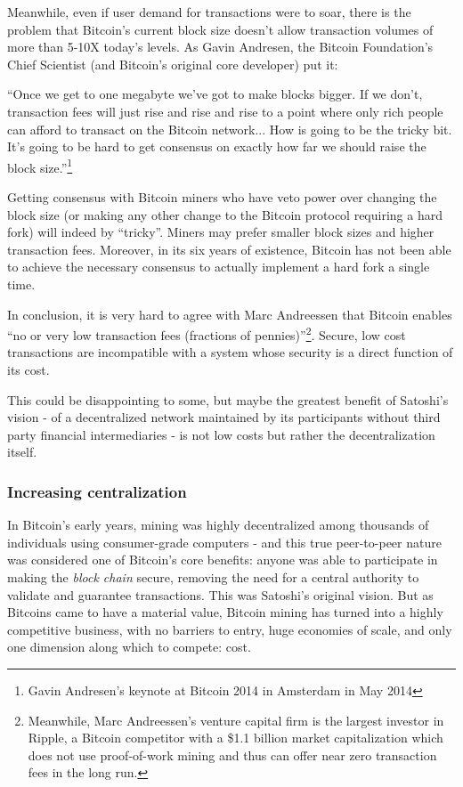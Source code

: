 \documentclass[a4paper,11pt]{article}
\begin{document}
Meanwhile, even if user demand for transactions were to soar, there is the problem that Bitcoin's current block size doesn't allow transaction volumes of more than 5-10X today's levels. As Gavin Andresen, the Bitcoin Foundation's Chief Scientist (and Bitcoin's original core developer) put it:

``Once we get to one megabyte we've got to make blocks bigger. If we don't, transaction fees will just rise and rise and rise to a point where only rich people can afford to transact on the Bitcoin network... How is going to be the tricky bit. It's going to be hard to get consensus on exactly how far we should raise the block size.''\footnote{Gavin Andresen's keynote at Bitcoin 2014 in Amsterdam in May 2014}

Getting consensus with Bitcoin miners who have veto power over changing the block size (or making any other change to the Bitcoin protocol requiring a hard fork)  will indeed by ``tricky''. Miners may prefer smaller block sizes and higher transaction fees. Moreover, in its six years of existence, Bitcoin has not been able to achieve the necessary consensus to actually implement a hard fork a single time. 

In conclusion, it is very hard to agree with Marc Andreessen that Bitcoin enables ``no or very low transaction fees (fractions of pennies)''\footnote{Meanwhile, Marc Andreessen's venture capital firm is the largest investor in Ripple, a Bitcoin competitor with a \$1.1 billion market capitalization which does not use proof-of-work mining and thus can offer near zero transaction fees in the long run.}. Secure, low cost transactions are incompatible with a system whose security is a direct function of its cost.

This could be disappointing to some, but maybe the greatest benefit of Satoshi's vision - of a decentralized network maintained by its participants without third party financial intermediaries - is not low costs but rather the decentralization itself.

\subsubsection{Increasing centralization}

In Bitcoin's early years, mining was highly decentralized among thousands of individuals using consumer-grade computers - and this true peer-to-peer nature was considered one of Bitcoin's core benefits: anyone was able to participate in making the \textit{block chain} secure, removing the need for a central authority to validate and guarantee transactions. This was Satoshi's original vision. But as Bitcoins came to have a material value, Bitcoin mining has turned into a highly competitive business, with no barriers to entry, huge economies of scale, and only one dimension along which to compete: cost.
\end{document}
